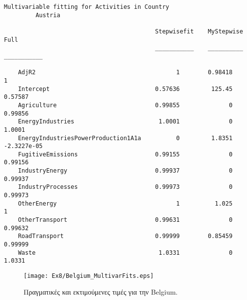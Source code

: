 \documentclass[11pt]{scrartcl} %
\begin{document}
\begin{Verbatim}[fontsize=\small]
Multivariable fitting for Activities in Country
 	 	 Austria

                                           Stepwisefit    MyStepwise       Full    
                                           ___________    __________    ___________

    AdjR2                                        1        0.98418                 1
    Intercept                              0.57636         125.45           0.57587
    Agriculture                            0.99855              0           0.99856
    EnergyIndustries                        1.0001              0            1.0001
    EnergyIndustriesPowerProduction1A1a          0         1.8351       -2.3227e-05
    FugitiveEmissions                      0.99155              0           0.99156
    IndustryEnergy                         0.99937              0           0.99937
    IndustryProcesses                      0.99973              0           0.99973
    OtherEnergy                                  1          1.025                 1
    OtherTransport                         0.99631              0           0.99632
    RoadTransport                          0.99999        0.85459           0.99999
    Waste                                   1.0331              0            1.0331
\end{Verbatim}



\begin{figure}[H]
 
	\centering
	\texttt{[image: Ex8/Belgium\_MultivarFits.eps]}	
\caption{Πραγματικές και εκτιμούμενες τιμές για την Belgium.}
\label{fig:z82}
\end{figure}
\end{document}
